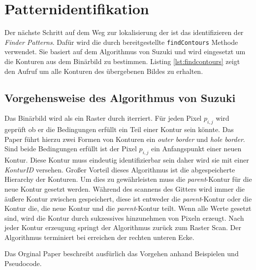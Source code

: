 \chapter{Patternidentifikation}
Der nächste Schritt auf dem Weg zur lokalisierung der \QRCodes ist das identifizieren der \emph{Finder Patterns}. Dafür wird die durch \OpenCV bereitgestellte \texttt{findContours} Methode verwendet. Sie basiert auf dem Algorithmus von Suzuki und wird eingesetzt um die Konturen aus dem Binärbild zu bestimmen.
Listing \ref{lst:findcontours} zeigt den Aufruf um alle Konturen des übergebenen Bildes zu erhalten.

\section{Vorgehensweise des Algorithmus von Suzuki}
Das Binärbild wird als ein Raster durch iterriert. Für jeden Pixel $p_{i,j}$ wird geprüft ob er die Bedingungen erfüllt ein Teil einer Kontur sein könnte. Das Paper     führt hierzu zwei Formen von Konturen ein \emph{outer border} und \emph{hole border}. Sind beide Bedingungen erfüllt ist der Pixel $p_{i,j}$ ein Anfangspunkt einer neuen Kontur. Diese Kontur muss eindeutig identifizierbar sein daher wird sie mit einer \emph{KonturID} versehen. Großer Vorteil dieses Algorithmus ist die abgespeicherte Hierarchy der Konturen. Um dies zu gewährleisten muss die \emph{parent}-Kontur für die neue Kontur gesetzt werden. Während des scannens des Gitters wird immer die äußere Kontur zwischen gespeichert, diese ist entweder die \emph{parent}-Kontur oder die Kontur die, die neue Kontur und die \emph{parent}-Kontur teilt. Wenn alle Werte gesetzt sind, wird die Kontur durch sukzessives hinzunehmen von Pixeln erzeugt. Nach jeder Kontur erzeugung springt der Algorithmus zurück zum Raster Scan. Der Algorithmus terminiert bei erreichen der rechten unteren Ecke.

Das Orginal Paper beschreibt ausfürlich das Vorgehen anhand Beispielen und Pseudocode.

